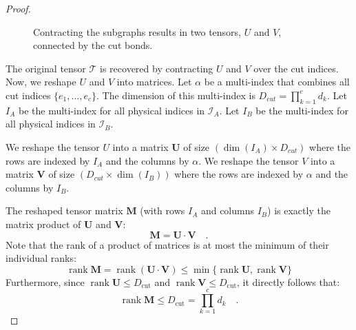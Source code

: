 \documentclass[../../main.tex]{subfiles}
\begin{document}
\begin{proof}
\begin{figure}[h!]
\centering
{}
\caption{Contracting the subgraphs results in two tensors, $U$ and $V$, connected by the cut bonds.}
\end{figure}

The original tensor $\mathcal{T}$ is recovered by contracting $U$ and $V$ over the cut indices. Now, we reshape $U$ and $V$ into matrices. Let $\alpha$ be a multi-index that combines all cut indices $\{e_1, \dots, e_c\}$. The dimension of this multi-index is $D_{cut} = \prod_{k=1}^{c} d_k$.
Let $I_A$ be the multi-index for all physical indices in $\mathcal{I}_A$.
Let $I_B$ be the multi-index for all physical indices in $\mathcal{I}_B$.

We reshape the tensor $U$ into a matrix $\mathbf{U}$ of size $(\dim(I_A) \times D_{cut})$ where the rows are indexed by $I_A$ and the columns by $\alpha$.
We reshape the tensor $V$ into a matrix $\mathbf{V}$ of size $(D_{cut} \times \dim(I_B))$ where the rows are indexed by $\alpha$ and the columns by $I_B$.

The reshaped tensor matrix $\bm{M}$ (with rows $I_A$ and columns $I_B$) is exactly the matrix product of $\mathbf{U}$ and $\mathbf{V}$:
$$ \bm{M} = \mathbf{U} \cdot \mathbf{V} \quad . $$
Note that the rank of a product of matrices is at most the minimum of their individual ranks:
$$ \operatorname{rank}\bm{M} = \operatorname{rank}(\mathbf{U} \cdot \mathbf{V}) \le \min\{\operatorname{rank}\mathbf{U}, \operatorname{rank}\mathbf{V} \} $$
Furthermore, since $\operatorname{rank}\mathbf{U} \leq D_{\text{cut}}$ and $\operatorname{rank}\mathbf{V} \leq D_{\text{cut}}$, it directly follows that:
    $$
    \operatorname{rank}\bm{M} \le D_{\text{cut}} = \prod_{k=1}^{c} d_k \quad .
    $$
\end{proof}
\end{document}
